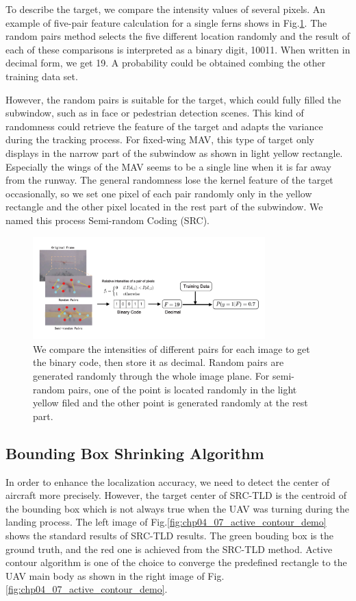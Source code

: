 To describe the target, we compare the intensity values of several pixels.  An example of five-pair feature calculation for a single ferns shows in Fig.\ref{fig:01_TLD_Code}. The random pairs method selects the five different location randomly and the result of each of these comparisons is interpreted as a binary digit, 10011. When written in decimal form, we get 19. A probability could be obtained combing the other training data set.

However, the random pairs is suitable for the target, which could fully filled the subwindow, such as in face or pedestrian detection scenes. This kind of randomness could retrieve the feature of the target and adapts the variance during the tracking process. For fixed-wing MAV, this type of target only displays in the narrow part of the subwindow as shown in light yellow rectangle. Especially the wings of the MAV seems to be a single line when it is far away from the runway. The general randomness lose the kernel feature of the target occasionally, so we set one pixel of each pair randomly only in the yellow rectangle and the other pixel located in the rest part of the subwindow.  We named this process Semi-random Coding (SRC). 

\begin{figure}[!th]
	\centering
	\includegraphics[width=0.8\textwidth]{Figs/01_TLD_Code.pdf}
	\caption{ We compare the intensities of different pairs for each image to get the binary code, then store it as decimal. Random pairs are generated randomly through the whole image plane. For semi-random pairs, one of the point is located randomly in the light yellow ﬁled and the other point is generated randomly at the rest part.}
	\label{fig:01_TLD_Code}    
\end{figure}


\subsection{Bounding Box Shrinking Algorithm}
In order to enhance the localization accuracy, we need to detect the center of aircraft more precisely. However, the target center of SRC-TLD is the centroid of the bounding box which is not always true when the UAV was turning during the landing process. The left image of Fig.\ref{fig:chp04_07_active_contour_demo} shows the standard results of SRC-TLD results. The green bouding box is the ground truth, and the red one is achieved from the SRC-TLD method. Active contour algorithm is one of the choice to converge the predefined rectangle to the UAV main body as shown in the right image of Fig.\ref{fig:chp04_07_active_contour_demo}.

